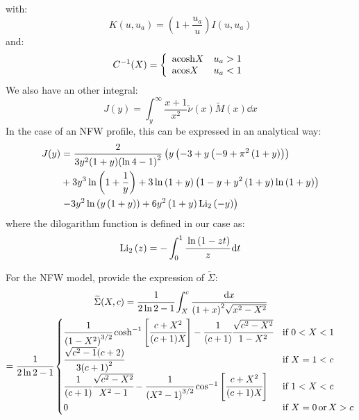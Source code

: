 %
with:
%
\begin{equation}
    K(u,u_a)=\left({1+\frac{u_a}{u}}\right){I(u,u_a)}
\end{equation}
%
and:
%
\begin{equation}
    C^{-1}(X)=\left\{\begin{array}{lr}
        {\rm{acosh}}{X}&u_a>1\\
        {\rm{acos}}{X}&u_a<1\\
    \end{array}\right.
\end{equation}
%
We also have an other integral:
%
\begin{equation}
    J(y)=\int_y^{\infty}\frac{x+1}{x^2}\widetilde{\nu}{(x)}\widetilde{M}{(x)}\dd{x}
\end{equation}
%
In the case of an NFW profile, this can be expressed in an analytical way:
%
\begin{align*}
    J(y)&=
        \frac{2}{3{y^2}(1+y){\left(\ln{4}-1\right)}^2}
        \left(y\left(-3+y\left(-9+\pi^2\left(1+y\right)\right)\right)\right.\\
    &+3{y^3}\ln\left(1+\frac{1}{y}\right)+3\ln\left(1+y\right)
            \left(1-y+y^2\left(1+y\right)\ln\left(1+y\right)\right)\\
    &\left.-3{y^2}\ln\left({y}\left(1+y\right)\right)+6{y^2}
        \left(1+y\right){\mathrm{Li}_2\left(-y\right)}\right)\\
\end{align*}
%
where the dilogarithm function is defined in our case as:
%
\begin{equation}
    \mathrm{Li}_2\left(z\right)=-\int_0^1\cfrac{\ln{(1-zt)}}{z}\,{\rm{d}}{t}
\end{equation}

For the NFW model, \citet{MBM+10} provide the expression of
$\widetilde{\Sigma}$:
%
\begin{multline}
    \widetilde{\Sigma}(X,c)=\cfrac{1}{2\ln2-1}\int_X^c\cfrac{{\rm{d}}{x}}{{(1+x)}^2\sqrt{x^2-X^2}}\\
    =\cfrac{1}{2\ln2-1}\begin{cases}
        \cfrac{1}{{(1-X^2)}^{3/2}}
        \cosh^{-1}\left[\cfrac{c+X^2}{(c+1)X}\right]-
        \cfrac{1}{(c+1)}\cfrac{\sqrt{c^2-X^2}}{1-X^2} &\text{if } 0<X<1 \\
    \cfrac{\sqrt{c^2-1}(c+2)}{3{(c+1)}^2} &\text{if } X=1<c\\
    \cfrac{1}{(c+1)}\cfrac{\sqrt{c^2-X^2}}{X^2-1}-
    \cfrac{1}{{(X^2-1)}^{3/2}}
    \cos^{-1}\left[\cfrac{c+X^2}{(c+1)X}\right] &\text{if } 1<X<c\\
    0 &\text{if } X=0\,\text{or}\,X>c
    \end{cases}
\end{multline}

